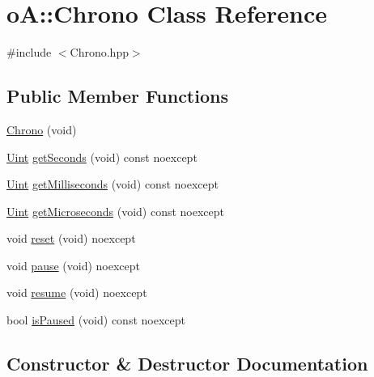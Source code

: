 \hypertarget{classo_a_1_1_chrono}{}\section{oA\+:\+:Chrono Class Reference}
\label{classo_a_1_1_chrono}


{\ttfamily \#include $<$Chrono.\+hpp$>$}

\subsection*{Public Member Functions}
\begin{DoxyCompactItemize}
\item 
\mbox{\hyperlink{classo_a_1_1_chrono_aec5a69450af4387e5d1b2b2344dc2bcd}{Chrono}} (void)
\item 
\mbox{\hyperlink{namespaceo_a_abe1d8250226c5cf34f84d7b75fc7922e}{Uint}} \mbox{\hyperlink{classo_a_1_1_chrono_a41692d0d58ca6cfc3570d1b2169b4a96}{get\+Seconds}} (void) const noexcept
\item 
\mbox{\hyperlink{namespaceo_a_abe1d8250226c5cf34f84d7b75fc7922e}{Uint}} \mbox{\hyperlink{classo_a_1_1_chrono_ad77117d4c523970030eda4cec93add7c}{get\+Milliseconds}} (void) const noexcept
\item 
\mbox{\hyperlink{namespaceo_a_abe1d8250226c5cf34f84d7b75fc7922e}{Uint}} \mbox{\hyperlink{classo_a_1_1_chrono_ac5ed210f5be9e507c95940356338bd88}{get\+Microseconds}} (void) const noexcept
\item 
void \mbox{\hyperlink{classo_a_1_1_chrono_a16943e5e5a0a768cd5b1a7af2deed739}{reset}} (void) noexcept
\item 
void \mbox{\hyperlink{classo_a_1_1_chrono_a64646924bdd219e72b58999745928fe6}{pause}} (void) noexcept
\item 
void \mbox{\hyperlink{classo_a_1_1_chrono_a2056863ec3fa0a94ed02fa0393b116e9}{resume}} (void) noexcept
\item 
bool \mbox{\hyperlink{classo_a_1_1_chrono_aeeaed136925a70bd668648b0a99b3f8e}{is\+Paused}} (void) const noexcept
\end{DoxyCompactItemize}


\subsection{Constructor \& Destructor Documentation}
\mbox{\label{classo_a_1_1_chrono_aec5a69450af4387e5d1b2b2344dc2bcd}} 
